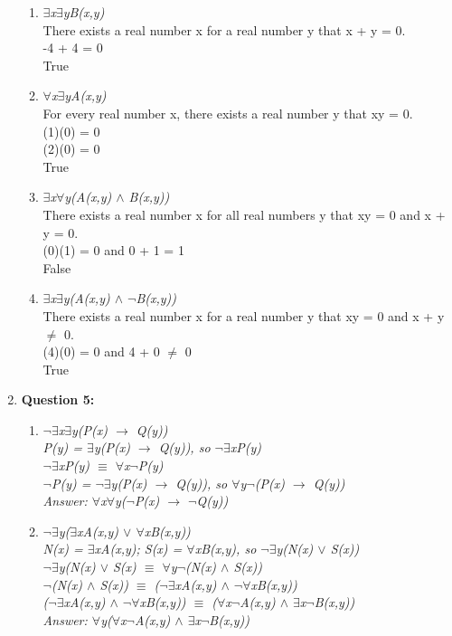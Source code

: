\documentclass[11pt]{article}
\begin{document}
\begin{enumerate}
\begin {enumerate} [label = (\alph*)]
\item %
\textit {$\exists$x$\exists$yB(x,y)} \\
There exists a real number x for a real number y that x + y = 0. \\
-4 + 4 = 0 \\
True 

\item %
\textit {$\forall$x$\exists$yA(x,y)} \\
For every real number x, there exists a real number y that xy = 0. \\
(1)(0) = 0 \\
(2)(0) = 0 \\
True

\item %
\textit {$\exists$x$\forall$y(A(x,y) $\land$ B(x,y))} \\
There exists a real number x for all real numbers y that xy = 0 and x + y = 0. \\
(0)(1) = 0 and 0 + 1 = 1 \\
False

\item %
\textit {$\exists$x$\exists$y(A(x,y) $\land$ $\lnot$B(x,y))} \\
There exists a real number x for a real number y that xy = 0 and x + y $\neq$ 0. \\
(4)(0) = 0 and 4 + 0 $\neq$ 0 \\
True
\end {enumerate}

\item %
\textbf {Question 5: }
\begin {enumerate} [label = (\alph*)]
\item %
\textit {
$\lnot$$\exists$x$\exists$y(P(x) $\to$ Q(y)) \\
P(y) = $\exists$y(P(x) $\to$ Q(y)), so $\lnot$$\exists$xP(y) \\
$\lnot$$\exists$xP(y) $\equiv$ $\forall$x$\lnot$P(y) \\
$\lnot$P(y) = $\lnot$$\exists$y(P(x) $\to$ Q(y)), so $\forall$y$\lnot$(P(x) $\to$ Q(y)) \\
Answer: $\forall$x$\forall$y($\lnot$P(x) $\to$ $\lnot$Q(y))
} 

\item %
\textit {$\lnot$$\exists$y($\exists$xA(x,y) $\lor$ $\forall$xB(x,y)) \\
N(x) = $\exists$xA(x,y); S(x) = $\forall$xB(x,y), so $\lnot$$\exists$y(N(x) $\lor$ S(x)) \\
$\lnot$$\exists$y(N(x) $\lor$ S(x) $\equiv$ $\forall$y$\lnot$(N(x) $\land$ S(x)) \\
$\lnot$(N(x) $\land$ S(x)) $\equiv$ ($\lnot$$\exists$xA(x,y) $\land$ $\lnot$$\forall$xB(x,y)) \\
($\lnot$$\exists$xA(x,y) $\land$ $\lnot$$\forall$xB(x,y)) $\equiv$ ($\forall$x$\lnot$A(x,y) $\land$ $\exists$x$\lnot$B(x,y)) \\
Answer: $\forall$y($\forall$x$\lnot$A(x,y) $\land$ $\exists$x$\lnot$B(x,y))}

\end {enumerate}

\end{enumerate}
\end{document}
